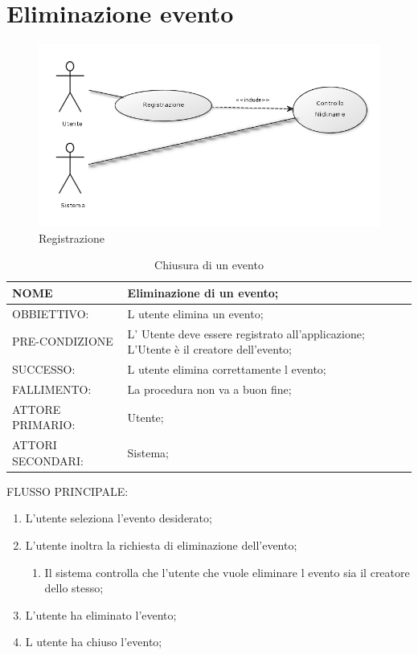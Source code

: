 \section{Eliminazione evento}
\begin{figure}[H]
\centering
\includegraphics[scale=0.55]{img/registrazione.png}
\caption{Registrazione}
\label{fig:registrazione}
\end{figure}
\begin{table}[H]
\begin{tabular}{p{}|p{}}
\toprule
NOME & Eliminazione di un evento;\\
\hline
OBBIETTIVO: & L utente elimina un evento;\\
\hline
PRE-CONDIZIONE & L' Utente deve essere registrato all'applicazione;
L'Utente è il creatore dell'evento;\\
\hline
SUCCESSO: & L utente elimina correttamente l evento;\\
\hline
FALLIMENTO: & La procedura non va a buon fine;\\
\hline
ATTORE PRIMARIO: & Utente;\\
\hline
ATTORI SECONDARI: & Sistema;\\
\bottomrule
\end{tabular}
\caption{Chiusura di un evento}
\label{table:chiude}
\end{table}	

FLUSSO PRINCIPALE:
\begin{enumerate}
\item L'utente seleziona l'evento desiderato;
\item L'utente inoltra la richiesta di eliminazione dell'evento;
\begin{enumerate}
\item Il sistema controlla che l'utente che vuole eliminare l evento sia il creatore dello stesso;
\end{enumerate}
\item L'utente ha eliminato l'evento;
\item L utente ha chiuso l'evento;
\end{enumerate}


